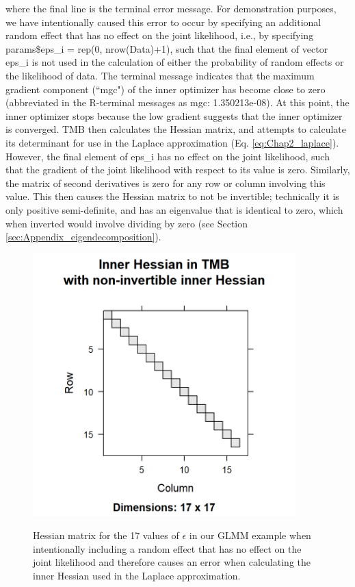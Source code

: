%
\lstset{style=Routput}

where the final line is the terminal error message.  For demonstration purposes, we have intentionally caused this error to occur by specifying an additional random effect that has no effect on the joint likelihood, i.e., by specifying \colorbox{backcolour}{params\$eps\_i = rep(0, nrow(Data)+1)}, such that the final element of vector \colorbox{backcolour}{eps\_i} is not used in the calculation of either the probability of random effects or the likelihood of data.  The terminal message indicates that the maximum gradient component (``mgc") of the inner optimizer has become close to zero (abbreviated in the R-terminal messages as \colorbox{backcolour}{mgc: 1.350213e-08}).  At this point, the inner optimizer stops because the low gradient suggests that the inner optimizer is converged.  TMB then calculates the Hessian matrix, and attempts to calculate its determinant for use in the Laplace approximation (Eq. \ref{eq:Chap2_laplace}).  However, the final element of \colorbox{backcolour}{eps\_i} has no effect on the joint likelihood, such that the gradient of the joint likelihood with respect to its value is zero.  Similarly, the matrix of second derivatives is zero for any row or column involving this value.  This then causes the Hessian matrix to not be invertible;  technically it is only positive semi-definite, and has an eigenvalue that is identical to zero, which when inverted would involve dividing by zero (see Section \ref{sec:Appendix_eigendecomposition}).  

\begin{figure}[!ht]
   \caption[Sparsity pattern for non-invertible inner Hessian matrix]{Hessian matrix for the 17 values of \(\epsilon\) in our GLMM example when intentionally including a random effect that has no effect on the joint likelihood and therefore causes an error when calculating the inner Hessian used in the Laplace approximation.}
    \centering
    \includegraphics[width=4in]{Chap_2/TMB_hessian_bug.png}
     \label{fig:Chap2_TMB_hessian_bug}
\end{figure}

